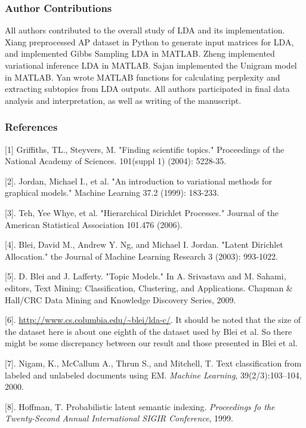 \documentclass{article} %
\begin{document}
\subsubsection*{Author Contributions}
All authors contributed to the overall study of LDA and its implementation. Xiang preprocessed AP dataset in Python to generate input matrices for LDA, and implemented Gibbs Sampling LDA in MATLAB. Zheng implemented variational inference LDA in MATLAB. Sajan implemented the Unigram model in MATLAB. Yan wrote MATLAB functions for calculating perplexity and extracting subtopics from LDA outputs. All authors participated in final data analysis and interpretation, as well as writing of the manuscript.

\newpage
\subsubsection*{References}


\small{

[1] Griffiths, TL., Steyvers, M. "Finding scientific topics." Proceedings of the National Academy of Sciences.  101(suppl 1) (2004): 5228-35.

[2]. Jordan, Michael I., et al. "An introduction to variational methods for graphical models." Machine Learning 37.2 (1999): 183-233.

[3]. Teh, Yee Whye, et al. "Hierarchical Dirichlet Processes." Journal of the American Statistical Association 101.476 (2006).

[4]. Blei, David M., Andrew Y. Ng, and Michael I. Jordan. "Latent Dirichlet Allocation." the Journal of Machine Learning Research 3 (2003): 993-1022.

[5]. D. Blei and J. Lafferty. "Topic Models." In A. Srivastava and M. Sahami, editors, Text Mining: Classification, Clustering, and Applications. Chapman $\&$ Hall/CRC Data Mining and Knowledge Discovery Series, 2009.

[6]. \url{http://www.cs.columbia.edu/~blei/lda-c/}. It should be noted that the size of the dataset here is about one eighth of the dataset used by Blei et al. So there might be some discrepancy between our result and those presented in Blei et al.

[7]. Nigam, K., McCallum A., Thrun S., and Mitchell, T. Text classification from labeled and unlabeled documents using EM. \textit{Machine Learning}, 39(2/3):103--104, 2000.

[8]. Hoffman, T. Probabilistic latent semantic indexing. \textit{Proceedings fo the Twenty-Second Annual International SIGIR Conference}, 1999.
}
\end{document}
